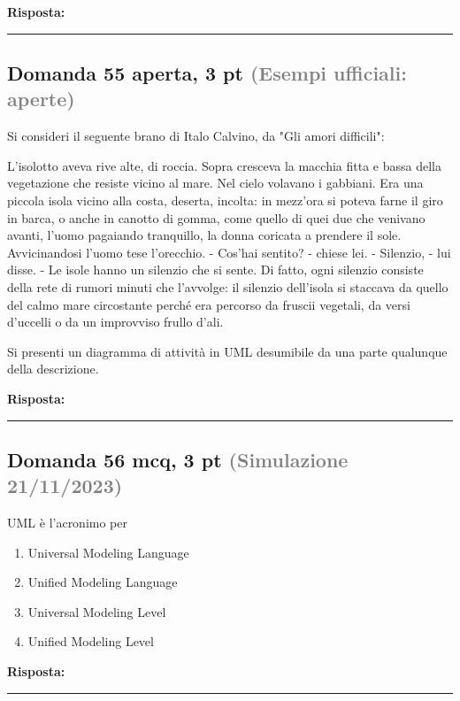 \documentclass[a4paper,11pt]{article}
\begin{document}
\vspace{0.2cm}
\noindent\textbf{Risposta:}\par
\vspace{4cm}\hrule


\subsection*{Domanda 55 \hfill {\small aperta, 3 pt \textcolor{gray}{(Esempi ufficiali: aperte)}}}
\begin{tcolorbox}[colback=gray!8,colframe=gray!50,title=Contesto]
Si consideri il seguente brano di Italo Calvino, da "Gli amori difficili":

L'isolotto aveva rive alte, di roccia. Sopra cresceva la macchia fitta e bassa della vegetazione che resiste vicino al mare. Nel cielo volavano i gabbiani. Era una piccola isola vicino alla costa, deserta, incolta: in mezz'ora si poteva farne il giro in barca, o anche in canotto di gomma, come quello di quei due che venivano avanti, l'uomo pagaiando tranquillo, la donna coricata a prendere il sole. Avvicinandosi l'uomo tese l'orecchio. - Cos'hai sentito? - chiese lei. - Silenzio, - lui disse. - Le isole hanno un silenzio che si sente. Di fatto, ogni silenzio consiste della rete di rumori minuti che l'avvolge: il silenzio dell'isola si staccava da quello del calmo mare circostante perché era percorso da fruscii vegetali, da versi d'uccelli o da un improvviso frullo d'ali.
\end{tcolorbox}
Si presenti un diagramma di attività in UML desumibile da una parte qualunque della descrizione.

\vspace{0.2cm}
\noindent\textbf{Risposta:}\par
\vspace{4cm}\hrule


\subsection*{Domanda 56 \hfill {\small mcq, 3 pt \textcolor{gray}{(Simulazione 21/11/2023)}}}
UML è l'acronimo per

\begin{enumerate}[label=\alph*)]
\item Universal Modeling Language
\item Unified Modeling Language
\item Universal Modeling Level
\item Unified Modeling Level
\end{enumerate}
\vspace{0.2cm}
\noindent\textbf{Risposta:}\par
\vspace{1.5cm}\hrule
\end{document}
